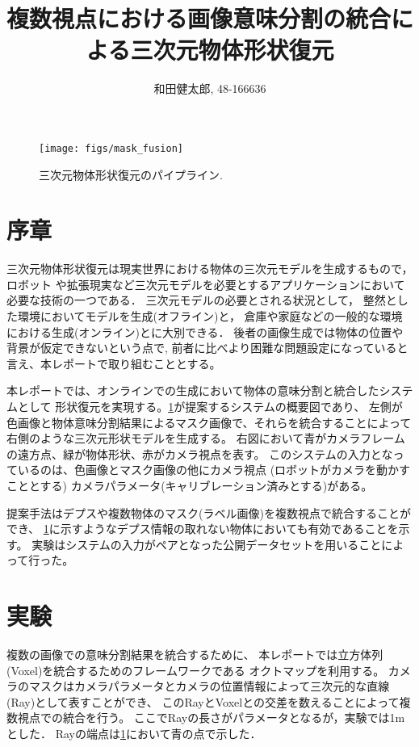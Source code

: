 \documentclass{jarticle}
\begin{document}
\title{複数視点における画像意味分割の統合による三次元物体形状復元}
\author{和田健太郎, 48-166636}

\maketitle

\begin{figure}[t]
  \centering
  \texttt{[image: figs/mask\_fusion]}
  \caption{三次元物体形状復元のパイプライン.}
  \label{fig:system}
\end{figure}

\section{序章}

三次元物体形状復元は現実世界における物体の三次元モデルを生成するもので，
ロボット\cite{eppner2016lessons}
や拡張現実\cite{newcombe2011kinectfusion}など三次元モデルを必要とするアプリケーションにおいて
必要な技術の一つである．
三次元モデルの必要とされる状況として，
整然とした環境においてモデルを生成(オフライン)と，
倉庫や家庭などの一般的な環境における生成(オンライン)とに大別できる．
後者の画像生成では物体の位置や背景が仮定できないという点で,
前者に比べより困難な問題設定になっていると言え、本レポートで取り組むこととする。

本レポートでは、オンラインでの生成において物体の意味分割と統合したシステムとして
形状復元を実現する。\ref{fig:system}が提案するシステムの概要図であり、
左側が色画像と物体意味分割結果によるマスク画像で、それらを統合することによって
右側のような三次元形状モデルを生成する。
右図において青がカメラフレームの遠方点、緑が物体形状、赤がカメラ視点を表す。
このシステムの入力となっているのは、色画像とマスク画像の他にカメラ視点
(ロボットがカメラを動かすこととする)
カメラパラメータ(キャリブレーション済みとする)がある。

提案手法はデプスや複数物体のマスク(ラベル画像)を複数視点で統合することができ、
\ref{fig:system}に示すようなデプス情報の取れない物体においても有効であることを示す。
実験はシステムの入力がペアとなった公開データセット\cite{zeng2016multi}を用いることによって行った。

\section{実験}

複数の画像での意味分割結果を統合するために、
本レポートでは立方体列(Voxel)を統合するためのフレームワークである
オクトマップ\cite{hornung2013octomap}を利用する。
カメラのマスクはカメラパラメータとカメラの位置情報によって三次元的な直線(Ray)として表すことができ、
このRayとVoxelとの交差を数えることによって複数視点での統合を行う。
ここでRayの長さがパラメータとなるが，実験では1mとした．
Rayの端点は\ref{fig:system}において青の点で示した．
\end{document}

